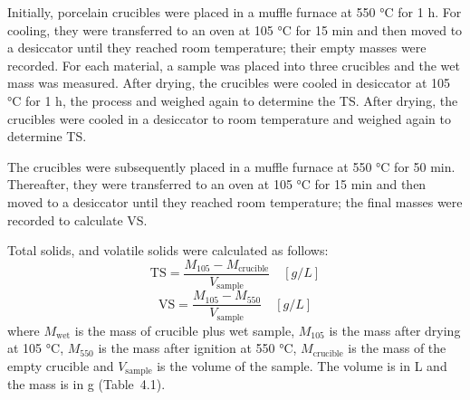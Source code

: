\documentclass[12pt, a4paper, oneside]{report}
\begin{document}
Initially, porcelain crucibles were placed in a muffle furnace at 550 °C for 1 h. For cooling, they were transferred to an oven at 105 °C for 15 min and then moved to a desiccator until they reached room temperature; their empty masses were recorded. For each material, a sample was placed into three crucibles and the wet mass was measured. After drying, the crucibles were cooled in desiccator at 105 °C for 1 h, the process and weighed again to determine the TS. After drying, the crucibles were cooled in a desiccator to room temperature and weighed again to determine TS.

The crucibles were subsequently placed in a muffle furnace at 550 °C for 50 min. Thereafter, they were transferred to an oven at 105 °C for 15 min and then moved to a desiccator until they reached room temperature; the final masses were recorded to calculate VS.

Total solids, and volatile solids were calculated as follows:
\[
    \mathrm{TS} = \frac{M_{105} - M_{\text{crucible}}}{V_{\text{sample}}} \quad \left[g /L\right]
\]
\[
    \mathrm{VS} = \frac{M_{105} - M_{550}}{V_{\text{sample}}} \quad \left[g /L\right]
\]
where $M_{\text{wet}}$ is the mass of crucible plus wet sample, $M_{105}$ is the mass after drying at 105 °C, $M_{550}$ is the mass after ignition at 550 °C, $M_{\text{crucible}}$ is the mass of the empty crucible and $V_{\text{sample}}$ is the volume of the sample. The volume is in L and the mass is in g (Table 4.1).

\begingroup
\tablesetup
\footnotesize
\setlength{\tabcolsep}{3pt}
\end{document}
